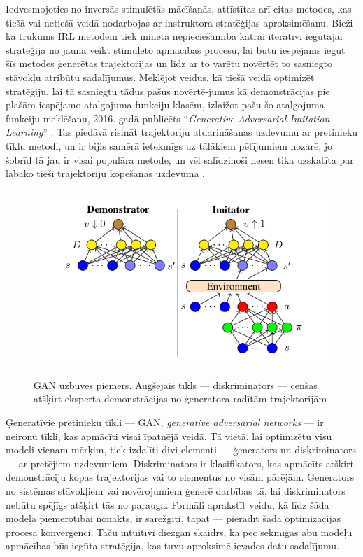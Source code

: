 \documentclass[12pt, a4paper]{article}
\numberwithin{equation}{section} %
\begin{document}
Iedvesmojoties no inversās stimulētās mācīšanās, attīstītas arī citas metodes, kas tiešā vai netiešā veidā nodarbojas ar instruktora stratēģijas aproksimēšanu. Bieži kā trūkums IRL metodēm tiek minēta nepieciešamība katrai iteratīvi iegūtajai stratēģija no jauna veikt stimulēto apmācības procesu, lai būtu iespējams iegūt šīs metodes ģenerētas trajektorijas un līdz ar to varētu novērtēt to sasniegto stāvokļu atribūtu sadalījumus. Meklējot veidus, kā tiešā veidā optimizēt stratēģiju, lai tā sasniegtu tādus pašus novērtē-jumus kā demonstrācijas pie plašām iespējamo atalgojuma funkciju klasēm, izlaižot pašu šo atalgojuma funkciju meklēšanu, 2016. gadā publicēts ``\textit{Generative Adversarial Imitation Learning}'' \cite{ho2016generative}. Tas piedāvā risināt trajektoriju atdarināšanas uzdevumu ar pretinieku tīklu metodi, un ir bijis samērā ietekmīgs uz tālākiem pētījumiem nozarē, jo šobrīd tā jau ir visai populāra metode, un vēl salīdzinoši nesen tika uzskatīta par labāko tieši trajektoriju kopēšanas uzdevumā \cite{torabi2018generative}.

\begin{figure}[t!]
    \centering
    \includegraphics[height=7cm,page=1]{../img/GAN.png}
    \caption{GAN uzbūves piemērs. Augšējais tīkls --- diskriminators --- cenšas atšķirt eksperta demonstrācijas no ģeneratora radītām trajektorijām \cite{torabi2018generative}}
\end{figure}

Ģeneratīvie pretinieku tīkli --- GAN, \textit{generative adversarial networks} --- ir neironu tīkli, kas apmācīti visai īpatnējā veidā. Tā vietā, lai optimizētu visu modeli vienam mērķim, tiek izdalīti divi elementi --- ģenerators un diskriminators --- ar pretējiem uzdevumiem. Diskriminators ir klasifikators, kas apmācīts atšķirt demonstrāciju kopas trajektorijas vai to elementus no visām pārējām. Ģenerators no sistēmas stāvokļiem vai novērojumiem ģenerē darbības tā, lai diskriminators nebūtu spējīgs atšķirt tās no parauga. Formāli aprakstīt veidu, kā līdz šāda modeļa piemērotībai nonākts, ir sarežģīti, tāpat --- pierādīt šāda optimizācijas procesa konverģenci. Taču intuitīvi diezgan skaidrs, ka pēc sekmīgas abu modeļu apmācības būs iegūta stratēģija, kas tuvu aproksimē ievades datu sadalījumu.
\end{document}
